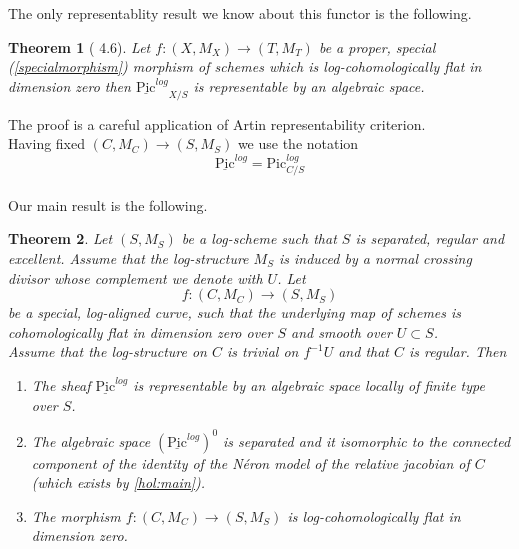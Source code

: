 \documentclass{amsart}
\newtheorem{thm}{Theorem}[section]
\theoremstyle{definition}
\numberwithin{equation}{section}
\begin{document}
\noindent The only representablity result we know about this functor is the following.
\begin{thm}[\cite{olpic} 4.6]\label{olssonrepres}
    Let $f:(X,M_X){\rightarrow} (T,M_T)$ be a proper, special (\ref{specialmorphism}) morphism of schemes which is log-cohomologically flat in dimension zero then ${\underline{\mbox{Pic}}^{log}}_{X/S}$ is representable by an algebraic space.
\end{thm}
\noindent The proof is a careful application of Artin representability criterion.\\ 
Having fixed $(C,M_C){\rightarrow} (S,M_S)$ we use the notation
$$
{\underline{\mbox{Pic}}^{log}}={\mbox{Pic}}_{C/S}^{log}
$$
\noindent\\
Our main result is the following.
\begin{thm}\label{teorema}
Let $(S,M_S)$ be a log-scheme such that $S$ is separated, regular and excellent. Assume that the log-structure $M_S$ is induced by a normal crossing divisor whose complement we denote with $U$. Let 
$$
f:(C,M_C){\rightarrow} (S,M_S)
$$
\noindent be a special, log-aligned curve, such that the underlying map of schemes is cohomologically flat in dimension zero over $S$ and smooth over $U\subset S$. \\ 
Assume that the log-structure on $C$ is trivial on $f^{-1}U$ and that $C$ is regular. Then 
\begin{enumerate}
    \item\label{repr} The sheaf ${\underline{\mbox{Pic}}^{log}}$ is representable by an algebraic space locally of finite type over $S$.
\item The algebraic space $({\underline{\mbox{Pic}}^{log}})^0$ is separated and it isomorphic to the connected component of the identity of the N\'eron model of the relative jacobian of $C$ (which exists by \ref{hol:main}).
\item The morphism $f:(C,M_C){\rightarrow} (S,M_S)$ is log-cohomologically flat in dimension zero.
\end{enumerate}
\end{thm}
\end{document}
